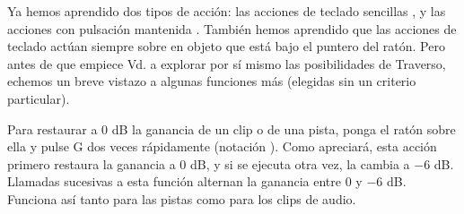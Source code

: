 Ya hemos aprendido dos tipos de acción: las acciones de teclado sencillas , y las acciones con pulsación mantenida . También hemos aprendido que las acciones de teclado actúan siempre sobre en objeto que está bajo el puntero del ratón. Pero antes de que empiece Vd. a explorar por sí mismo las posibilidades de Traverso, echemos un breve vistazo a algunas funciones más (elegidas sin un criterio particular).

Para restaurar a 0 dB la ganancia de un clip o de una pista, ponga el ratón sobre ella y pulse G dos veces rápidamente (notación ). Como apreciará, esta acción primero restaura la ganancia a 0 dB, y si se ejecuta otra vez, la cambia a $-6$ dB. Llamadas sucesivas a esta función alternan la ganancia entre 0 y $-6$ dB. Funciona así tanto para las pistas como para los clips de audio.

